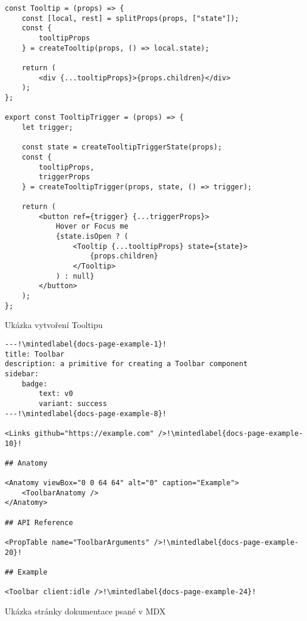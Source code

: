 \begin{listing}
    \begin{verbatim}
const Tooltip = (props) => {
    const [local, rest] = splitProps(props, ["state"]);
    const {
        tooltipProps
    } = createTooltip(props, () => local.state);
    
    return (
        <div {...tooltipProps}>{props.children}</div>
    );
};

export const TooltipTrigger = (props) => {
    let trigger;
    
    const state = createTooltipTriggerState(props);
    const {
        tooltipProps,
        triggerProps
    } = createTooltipTrigger(props, state, () => trigger);
    
    return (
        <button ref={trigger} {...triggerProps}>
            Hover or Focus me
            {state.isOpen ? (
                <Tooltip {...tooltipProps} state={state}>
                    {props.children}
                </Tooltip>
            ) : null}
        </button>
    );
};
\end{verbatim}
    \caption{Ukázka vytvoření Tooltipu}
    \label{tooltip-example}
\end{listing}

\begin{listing}
    \begin{verbatim}
---!\mintedlabel{docs-page-example-1}!
title: Toolbar
description: a primitive for creating a Toolbar component
sidebar:
    badge:
        text: v0
        variant: success
---!\mintedlabel{docs-page-example-8}!

<Links github="https://example.com" />!\mintedlabel{docs-page-example-10}!

## Anatomy

<Anatomy viewBox="0 0 64 64" alt="0" caption="Example">
    <ToolbarAnatomy />
</Anatomy>

## API Reference

<PropTable name="ToolbarArguments" />!\mintedlabel{docs-page-example-20}!

## Example

<Toolbar client:idle />!\mintedlabel{docs-page-example-24}!
\end{verbatim}
    \caption{Ukázka stránky dokumentace psané v MDX}
    \label{docs-page-example}
\end{listing}
